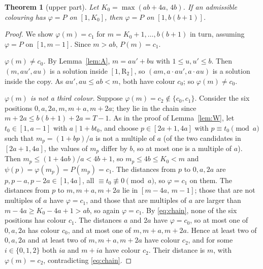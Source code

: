 \documentclass[11pt,a4paper]{article}
\newtheorem{theorem}{Theorem}[section]
\theoremstyle{definition}
\theoremstyle{remark}
\newcommand{\R}{\mathrm{R}}
\begin{document}
\begin{theorem}[upper part]\label{thm:upind}
Let $K_0=\max(ab+4a,\,4b)$. If an admissible colouring has $\varphi=P$ on $[1,K_0]$, then $\varphi=P$ on $[1,b(b+1)]$.
\end{theorem}
\begin{proof}
We show $\varphi(m)=c_1$ for $m=K_0+1,\dots,b(b+1)$ in turn, assuming $\varphi=P$ on $[1,m-1]$. Since $m>ab$, $P(m)=c_1$.

\emph{$\varphi(m)\ne c_0$.} By Lemma~\ref{lem:A}, $m=au'+bu$ with $1\le u,u'\le b$. Then $(m,au',au)$ is a solution inside $[1,\R_2]$, so $(am,a\cdot au',a\cdot au)$ is a solution inside the copy. As $au',au\le ab<m$, both have colour $c_0$; so $\varphi(m)\ne c_0$.

\emph{$\varphi(m)$ is not a third colour.} Suppose $\varphi(m)=c_2\notin\{c_0,c_1\}$. Consider the six positions $0,a,2a,m,m+a,m+2a$; they lie in the chain since $m+2a\le b(b+1)+2a=T-1$. As in the proof of Lemma~\ref{lem:W}, let $t_0\in[1,a-1]$ with $a\mid 1+bt_0$, and choose $p\in[2a+1,4a]$ with $p\equiv t_0\pmod a$ such that $m_p=(1+bp)/a$ is not a multiple of $a$ (of the two candidates in $[2a+1,4a]$, the values of $m_p$ differ by $b$, so at most one is a multiple of $a$). Then $m_p\le(1+4ab)/a<4b+1$, so $m_p\le4b\le K_0<m$ and $\psi(p)=\varphi(m_p)=P(m_p)=c_1$.
The distances from $p$ to $0,a,2a$ are $p,p-a,p-2a\in[1,4a]$, all $\equiv t_0\not\equiv0\pmod a$, so $\varphi=c_1$ on them. The distances from $p$ to $m,m+a,m+2a$ lie in $[m-4a,\,m-1]$; those that are not multiples of $a$ have $\varphi=c_1$, and those that are multiples of $a$ are larger than $m-4a\ge K_0-4a+1>ab$, so again $\varphi=c_1$. By \eqref{eq:chain}, none of the six positions has colour $c_1$.
The distances $a$ and $2a$ have $\varphi=c_0$, so at most one of $0,a,2a$ has colour $c_0$, and at most one of $m,m+a,m+2a$. Hence at least two of $0,a,2a$ and at least two of $m,m+a,m+2a$ have colour $c_2$, and for some $i\in\{0,1,2\}$ both $ia$ and $m+ia$ have colour $c_2$. Their distance is $m$, with $\varphi(m)=c_2$, contradicting \eqref{eq:chain}.
\end{proof}
\end{document}
